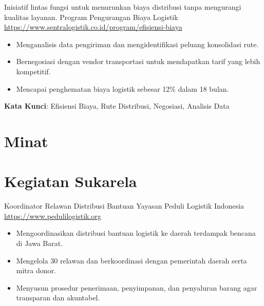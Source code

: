 \documentclass[a4paper, serif, 10pt]{moderncv}
\begin{document}
        {Inisiatif lintas fungsi untuk menurunkan biaya distribusi tanpa mengurangi kualitas layanan.}
        {Program Pengurangan Biaya Logistik}
        {\url{https://www.sentralogistik.co.id/program/efisiensi-biaya}}
        {}
        {\begin{itemize}
\item Menganalisis data pengiriman dan mengidentifikasi peluang konsolidasi rute.
\item Bernegosiasi dengan vendor transportasi untuk mendapatkan tarif yang lebih kompetitif.
\item Mencapai penghematan biaya logistik sebesar 12\% dalam 18 bulan.
\end{itemize}
\textbf{Kata Kunci}: Efisiensi Biaya, Rute Distribusi, Negosiasi, Analisis Data}
\section{Minat}

\section{Kegiatan Sukarela}

        {Koordinator Relawan Distribusi Bantuan}
        {Yayasan Peduli Logistik Indonesia}
        {\url{https://www.pedulilogistik.org}}
        {}
        {\begin{itemize}
\item Mengoordinasikan distribusi bantuan logistik ke daerah terdampak bencana di Jawa Barat.
\item Mengelola 30 relawan dan berkoordinasi dengan pemerintah daerah serta mitra donor.
\item Menyusun prosedur penerimaan, penyimpanan, dan penyaluran barang agar transparan dan akuntabel.
\end{itemize}}
    
\end{document}
